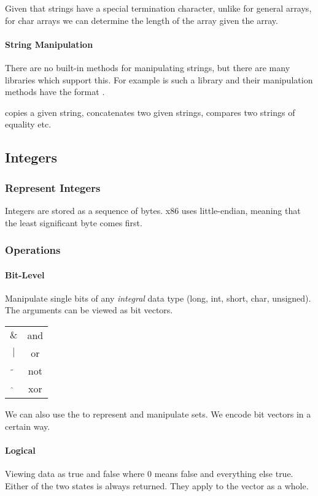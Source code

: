 Given that strings have a special termination character, unlike for general arrays, for char arrays we can determine the length of the array given the array.

\paragraph{String Manipulation}
There are no built-in methods for manipulating strings, but there are many libraries which support this. For example  is such a library and their manipulation methods have the format .

 copies a given string,  concatenates two given strings,  compares two strings of equality etc.

\subsection*{Integers}

\subsubsection{Represent Integers}
Integers are stored as a sequence of bytes. x86 uses little-endian, meaning that the least significant byte comes first.

\subsubsection{Operations}
\paragraph{Bit-Level}
Manipulate single bits of any \textit{integral} data type (long, int, short, char, unsigned). The arguments can be viewed as bit vectors.

\begin{tabular}{c | c}
    $\&$ & and\\
    $|$ & or\\
    $\tilde{}$ & not\\
    $\hat{}$ & xor
\end{tabular}

We can also use the to represent and manipulate sets. We encode bit vectors in a certain way. %

\paragraph{Logical}
Viewing data as true and false where $0$ means false and everything else true. Either of the two states is always returned. They apply to the vector as a whole.

